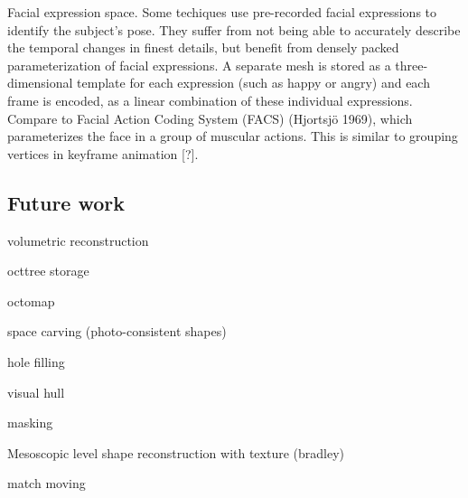 Facial expression space. Some techiques \cite{faceshift,something} use pre-recorded facial expressions to identify the subject's pose.
They suffer from not being able to accurately describe the temporal changes in finest details, but benefit from densely packed parameterization of facial expressions.
A separate mesh is stored as a three-dimensional template for each expression (such as happy or angry) and each frame is encoded, as a linear combination of these individual expressions.
%
Compare to Facial Action Coding System (FACS) (Hjortsjö 1969), which parameterizes the face in a group of muscular actions. This is similar to grouping vertices in keyframe animation [?].
%
%

\subsection{Future work}

volumetric reconstruction

octtree storage

octomap

space carving (photo-consistent shapes)

hole filling

visual hull

masking

Mesoscopic level shape reconstruction with texture (bradley)

match moving
